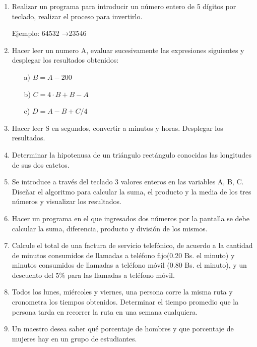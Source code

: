 \documentclass{scrartcl}
\begin{document}
\begin{enumerate}
		\item Realizar un programa para introducir un número entero de 5 dígitos por teclado, realizar el proceso para invertirlo.
		
		Ejemplo: 64532 →23546
		
		\item Hacer leer un numero A, evaluar sucesivamente las expresiones siguientes y desplegar los resultados obtenidos:
		
		\begin{itemize}
			\item [a)] $B=A-200$
			\item [b)] $C=4\cdot B+B-A$
			\item [c)] $D=A-B+C/4$
		\end{itemize}
		

		
		
		\item Hacer leer S en segundos, convertir a minutos y horas. Desplegar los resultados.
		
		\item Determinar la hipotenusa de un triángulo rectángulo conocidas las longitudes de sus dos catetos.
		
		\item Se introduce a través del teclado 3 valores enteros en las variables A, B, C. Diseñar el algoritmo para calcular la suma, el producto y la media de los tres números y visualizar los resultados.
		
		\item Hacer un programa en el que ingresados dos números por la pantalla se debe calcular la suma, diferencia, producto y división de los mismos.
		
		\item Calcule el total de una factura de servicio telefónico, de acuerdo a la cantidad de minutos consumidos de llamadas a teléfono fijo(0.20 Bs. el minuto) y minutos consumidos de llamadas a teléfono móvil (0.80 Bs. el minuto), y un descuento del 5\% para las llamadas a teléfono móvil.
		
		\item Todos los lunes, miércoles y viernes, una persona corre la misma ruta y cronometra los tiempos obtenidos. Determinar el tiempo promedio que la persona tarda en recorrer la ruta en una semana cualquiera.
		
		\item Un maestro desea saber qué porcentaje de hombres y que porcentaje de mujeres hay en un grupo de estudiantes.
		

\end{enumerate}
\end{document}
